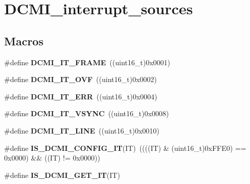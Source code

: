 \hypertarget{group___d_c_m_i__interrupt__sources}{}\section{D\+C\+M\+I\+\_\+interrupt\+\_\+sources}
\label{group___d_c_m_i__interrupt__sources}
\subsection*{Macros}
\begin{DoxyCompactItemize}
\item 
\hypertarget{group___d_c_m_i__interrupt__sources_gadaec1a969aa5f1f993157c3b7930ee15}{}\#define {\bfseries D\+C\+M\+I\+\_\+\+I\+T\+\_\+\+F\+R\+A\+M\+E}~((uint16\+\_\+t)0x0001)\label{group___d_c_m_i__interrupt__sources_gadaec1a969aa5f1f993157c3b7930ee15}

\item 
\hypertarget{group___d_c_m_i__interrupt__sources_ga5afbb2e1a8b64d9e042da18d8304667e}{}\#define {\bfseries D\+C\+M\+I\+\_\+\+I\+T\+\_\+\+O\+V\+F}~((uint16\+\_\+t)0x0002)\label{group___d_c_m_i__interrupt__sources_ga5afbb2e1a8b64d9e042da18d8304667e}

\item 
\hypertarget{group___d_c_m_i__interrupt__sources_gaef8a30c349bbe77a26052613053c0201}{}\#define {\bfseries D\+C\+M\+I\+\_\+\+I\+T\+\_\+\+E\+R\+R}~((uint16\+\_\+t)0x0004)\label{group___d_c_m_i__interrupt__sources_gaef8a30c349bbe77a26052613053c0201}

\item 
\hypertarget{group___d_c_m_i__interrupt__sources_gac60620cc8cfcff9063bb141f75bdedf6}{}\#define {\bfseries D\+C\+M\+I\+\_\+\+I\+T\+\_\+\+V\+S\+Y\+N\+C}~((uint16\+\_\+t)0x0008)\label{group___d_c_m_i__interrupt__sources_gac60620cc8cfcff9063bb141f75bdedf6}

\item 
\hypertarget{group___d_c_m_i__interrupt__sources_gab31edbfaa9359494beda9324bbe3a70d}{}\#define {\bfseries D\+C\+M\+I\+\_\+\+I\+T\+\_\+\+L\+I\+N\+E}~((uint16\+\_\+t)0x0010)\label{group___d_c_m_i__interrupt__sources_gab31edbfaa9359494beda9324bbe3a70d}

\item 
\hypertarget{group___d_c_m_i__interrupt__sources_ga73bb15913a02e43fa9e4519f16d8566b}{}\#define {\bfseries I\+S\+\_\+\+D\+C\+M\+I\+\_\+\+C\+O\+N\+F\+I\+G\+\_\+\+I\+T}(I\+T)~((((I\+T) \& (uint16\+\_\+t)0x\+F\+F\+E0) == 0x0000) \&\& ((\+I\+T) != 0x0000))\label{group___d_c_m_i__interrupt__sources_ga73bb15913a02e43fa9e4519f16d8566b}

\item 
\#define {\bfseries I\+S\+\_\+\+D\+C\+M\+I\+\_\+\+G\+E\+T\+\_\+\+I\+T}(I\+T)
\end{DoxyCompactItemize}


